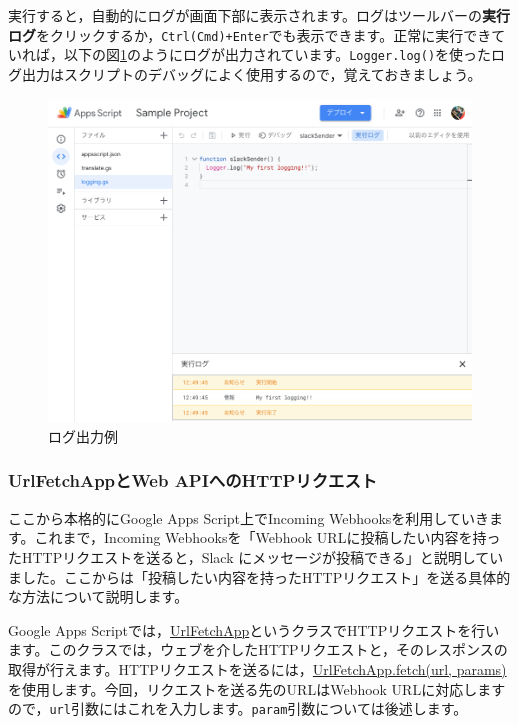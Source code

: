 \documentclass[uplatex,a4j]{jsarticle}
\begin{document}
実行すると，自動的にログが画面下部に表示されます。ログはツールバーの\textbf{実行ログ}をクリックするか，\verb|Ctrl(Cmd)+Enter|でも表示できます。正常に実行できていれば，以下の図\ref{fig:standalone_gas2}のようにログが出力されています。\verb|Logger.log()|を使ったログ出力はスクリプトのデバッグによく使用するので，覚えておきましょう。

\begin{figure}[H]
 \centering
 \includegraphics[keepaspectratio, scale=0.5]{images/standalone_gas2.png}
 \caption{ログ出力例}
 \label{fig:standalone_gas2}
\end{figure}

\subsubsection{UrlFetchAppとWeb APIへのHTTPリクエスト}


ここから本格的にGoogle Apps Script上でIncoming Webhooksを利用していきます。これまで，Incoming Webhooksを「Webhook URLに投稿したい内容を持ったHTTPリクエストを送ると，Slack にメッセージが投稿できる」と説明していました。ここからは「投稿したい内容を持ったHTTPリクエスト」を送る具体的な方法について説明します。

Google Apps Scriptでは，\href{https://developers.google.com/apps-script/reference/url-fetch/url-fetch-app}{UrlFetchApp}というクラスでHTTPリクエストを行います。このクラスでは，ウェブを介したHTTPリクエストと，そのレスポンスの取得が行えます。HTTPリクエストを送るには，\href{https://developers.google.com/apps-script/reference/url-fetch/url-fetch-app#fetchurl,-params}{UrlFetchApp.fetch(url, params)}を使用します。今回，リクエストを送る先のURLはWebhook URLに対応しますので，\verb|url|引数にはこれを入力します。\verb|param|引数については後述します。
\end{document}
